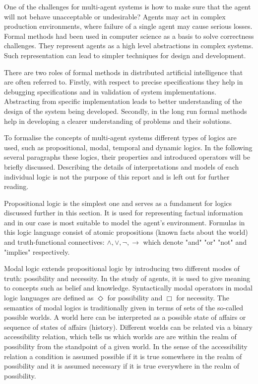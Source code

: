 One of the challenges for multi-agent systems is how to make sure that the agent will not behave unacceptable or undesirable? Agents may act in complex production environments, where failure of a single agent may cause serious losses. Formal methods had been used in computer science as a basis to solve correctness challenges. They represent agents as a high level abstractions in complex systems. Such representation can lead to simpler techniques for design and development.

There are two roles of formal methods in distributed artificial intelligence that are often referred to. Firstly, with respect to precise specifications they help in debugging specifications and in validation of system implementations. Abstracting from specific implementation leads to better understanding of the design of the system being developed. Secondly, in the long run formal methods help in developing a clearer understanding of problems and their solutions. \cite{Singh_99}

To formalise the concepts of multi-agent systems different types of logics are used, such as propositional, modal, temporal and dynamic logics. In the following several paragraphs these logics, their properties and introduced operators will be briefly discussed. Describing the details of interpretations and models of each individual logic is not the purpose of this report and is left out for further reading.

Propositional logic is the simplest one and serves as a fundament for logics discussed further in this section. It is used for representing factual information and in our case is most suitable to model the agent's environment. Formulas in this logic language consist of atomic propositions (known facts about the world) and truth-functional connectives: $\land,\lor,\neg,\rightarrow$ which denote "and" "or" "not" and "implies" respectively. \cite{Enderton_72}

Modal logic extends propositional logic by introducing two different modes of truth: possibility and necessity. In the study of agents, it is used to give
meaning to concepts such as belief and knowledge. Syntactically modal operators in modal logic languages are defined as $\Diamond$  for possibility and
$\Box$ for necessity. The semantics of modal logics is traditionally given in terms of sets of the so-called possible worlds. A world here can be interpreted as a possible state of affairs or sequence of states of affairs (history). Different worlds can be related via a binary accessibility relation, which tells us which worlds are are within the realm of possibility from the standpoint of a given world. In the sense of the accessibility relation a condition is assumed possible if it is true somewhere in the realm of possibility and it is assumed necessary if it is true everywhere in the realm of possibility. \cite{Saul_63}


